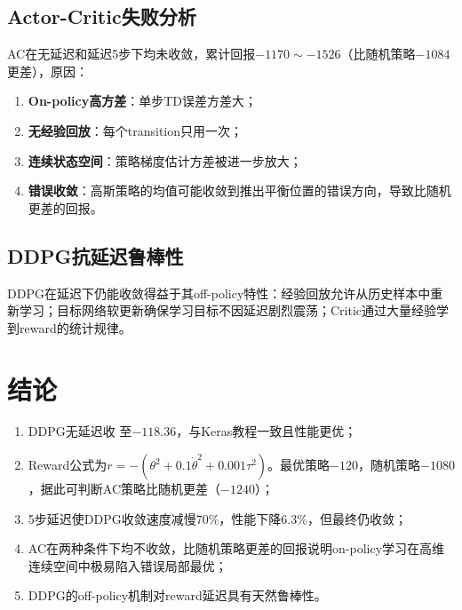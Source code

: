 \documentclass[UTF8,a4paper,12pt]{ctexart}
\begin{document}
\subsection{Actor-Critic失败分析}

AC在无延迟和延迟5步下均未收敛，累计回报$-1170\sim-1526$（比随机策略$-1084$更差），原因：
\begin{enumerate}[leftmargin=2em]
  \item \textbf{On-policy高方差}：单步TD误差方差大；
  \item \textbf{无经验回放}：每个transition只用一次；
  \item \textbf{连续状态空间}：策略梯度估计方差被进一步放大；
  \item \textbf{错误收敛}：高斯策略的均值可能收敛到推出平衡位置的错误方向，导致比随机更差的回报。
\end{enumerate}

\subsection{DDPG抗延迟鲁棒性}

DDPG在延迟下仍能收敛得益于其off-policy特性：经验回放允许从历史样本中重新学习；目标网络软更新确保学习目标不因延迟剧烈震荡；Critic通过大量经验学到reward的统计规律。

\section{结论}

\begin{enumerate}[leftmargin=2em]
  \item DDPG无延迟收 至$-118.36$，与Keras教程一致且性能更优；
  \item Reward公式为$r=-(\theta^2+0.1\dot\theta^2+0.001\tau^2)$。最优策略$-120$，随机策略$-1080$，据此可判断AC策略比随机更差（$-1240$）；
  \item 5步延迟使DDPG收敛速度减慢70\%，性能下降6.3\%，但最终仍收敛；
  \item AC在两种条件下均不收敛，比随机策略更差的回报说明on-policy学习在高维连续空间中极易陷入错误局部最优；
  \item DDPG的off-policy机制对reward延迟具有天然鲁棒性。
\end{enumerate}
\end{document}
